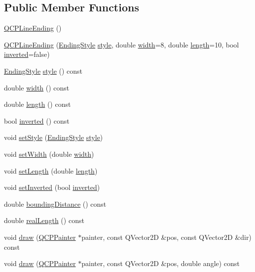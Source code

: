 \subsection*{Public Member Functions}
\begin{DoxyCompactItemize}
\item 
\hyperlink{classQCPLineEnding_af2eaf8123b000d97fbd11929c669f61b}{Q\+C\+P\+Line\+Ending} ()
\item 
\hyperlink{classQCPLineEnding_abb2abc7542f0c7a3c081d878248896a4}{Q\+C\+P\+Line\+Ending} (\hyperlink{classQCPLineEnding_a5ef16e6876b4b74959c7261d8d4c2cd5}{Ending\+Style} \hyperlink{classQCPLineEnding_aea324dbfddbca9895ca8a3a968671299}{style}, double \hyperlink{classQCPLineEnding_a028328ee3fb139a40acaf65fb56edf67}{width}=8, double \hyperlink{classQCPLineEnding_a1744315d7b73f6e7ead3621e2cb18c28}{length}=10, bool \hyperlink{classQCPLineEnding_aa4ffbb182cbc89fc3d92eb348630502c}{inverted}=false)
\item 
\hyperlink{classQCPLineEnding_a5ef16e6876b4b74959c7261d8d4c2cd5}{Ending\+Style} \hyperlink{classQCPLineEnding_aea324dbfddbca9895ca8a3a968671299}{style} () const 
\item 
double \hyperlink{classQCPLineEnding_a028328ee3fb139a40acaf65fb56edf67}{width} () const 
\item 
double \hyperlink{classQCPLineEnding_a1744315d7b73f6e7ead3621e2cb18c28}{length} () const 
\item 
bool \hyperlink{classQCPLineEnding_aa4ffbb182cbc89fc3d92eb348630502c}{inverted} () const 
\item 
void \hyperlink{classQCPLineEnding_a56953b9cb8ed1bed0f025c3935f16910}{set\+Style} (\hyperlink{classQCPLineEnding_a5ef16e6876b4b74959c7261d8d4c2cd5}{Ending\+Style} \hyperlink{classQCPLineEnding_aea324dbfddbca9895ca8a3a968671299}{style})
\item 
void \hyperlink{classQCPLineEnding_a26dc020ea985a72cc25881ce2115e34e}{set\+Width} (double \hyperlink{classQCPLineEnding_a028328ee3fb139a40acaf65fb56edf67}{width})
\item 
void \hyperlink{classQCPLineEnding_ae36fa01763751cd64b7f56c3507e935a}{set\+Length} (double \hyperlink{classQCPLineEnding_a1744315d7b73f6e7ead3621e2cb18c28}{length})
\item 
void \hyperlink{classQCPLineEnding_a580e4e2360b35ebb8d68f3494aa2335d}{set\+Inverted} (bool \hyperlink{classQCPLineEnding_aa4ffbb182cbc89fc3d92eb348630502c}{inverted})
\item 
double \hyperlink{classQCPLineEnding_a586b45cf738881a70119e353dc1ed59c}{bounding\+Distance} () const 
\item 
double \hyperlink{classQCPLineEnding_a6a528e6dc5aabe1077a573b045715f03}{real\+Length} () const 
\item 
void \hyperlink{classQCPLineEnding_ac4b2fa94bd27b2f008b5fc090fcd7c0b}{draw} (\hyperlink{classQCPPainter}{Q\+C\+P\+Painter} $\ast$painter, const Q\+Vector2D \&pos, const Q\+Vector2D \&dir) const 
\item 
void \hyperlink{classQCPLineEnding_a05c143b1f66cb68d746c309523c45e3e}{draw} (\hyperlink{classQCPPainter}{Q\+C\+P\+Painter} $\ast$painter, const Q\+Vector2D \&pos, double angle) const 
\end{DoxyCompactItemize}
